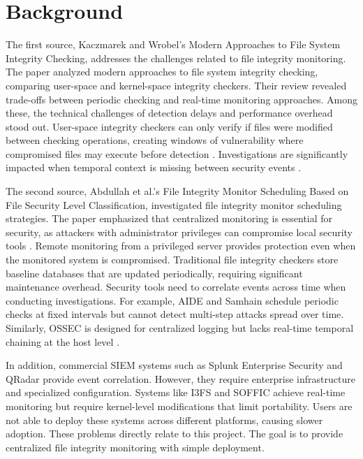 \documentclass[conference]{IEEEtran}
\begin{document}
\section{Background}

The first source, Kaczmarek and Wrobel's Modern Approaches to File System Integrity Checking, addresses the challenges related to file integrity monitoring. The paper analyzed modern approaches to file system integrity checking, comparing user-space and kernel-space integrity checkers. Their review revealed trade-offs between periodic checking and real-time monitoring approaches. Among these, the technical challenges of detection delays and performance overhead \cite{kaczmarek} stood out. User-space integrity checkers can only verify if files were modified between checking operations, creating windows of vulnerability where compromised files may execute before detection \cite{kaczmarek}. Investigations are significantly impacted when temporal context is missing between security events \cite{kaczmarek}.

The second source, Abdullah et al.'s File Integrity Monitor Scheduling Based on File Security Level Classification, investigated file integrity monitor scheduling strategies. The paper emphasized that centralized monitoring is essential for security, as attackers with administrator privileges can compromise local security tools \cite{abdullah}. Remote monitoring from a privileged server provides protection even when the monitored system is compromised. Traditional file integrity checkers store baseline databases that are updated periodically, requiring significant maintenance overhead. Security tools need to correlate events across time when conducting investigations. For example, AIDE and Samhain schedule periodic checks at fixed intervals but cannot detect multi-step attacks spread over time. Similarly, OSSEC is designed for centralized logging but lacks real-time temporal chaining at the host level \cite{abdullah}.

In addition, commercial SIEM systems such as Splunk Enterprise Security and QRadar provide event correlation. However, they require enterprise infrastructure and specialized configuration. Systems like I3FS and SOFFIC achieve real-time monitoring but require kernel-level modifications that limit portability. Users are not able to deploy these systems across different platforms, causing slower adoption. These problems directly relate to this project. The goal is to provide centralized file integrity monitoring with simple deployment.
\end{document}
